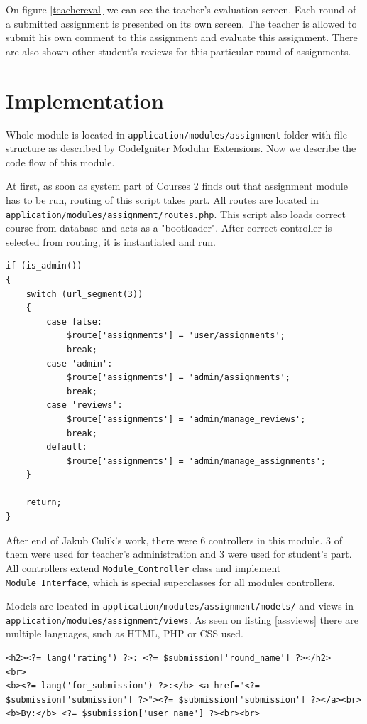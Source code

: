On figure \ref{teachereval} we can see the teacher's evaluation screen. Each round of a submitted assignment is presented on its own screen. The teacher is allowed to submit his own comment to this assignment and evaluate this assignment. There are also shown other student's reviews for this particular round of assignments. 

\section{Implementation}

Whole module is located in \texttt{application/modules/assignment} folder with file structure as described by CodeIgniter Modular Extensions. Now we describe the code flow of this module.


At first, as soon as system part of Courses 2 finds out that assignment module has to be run, routing of this script takes part. All routes are located in \texttt{application/modules/assignment/routes.php}. This script also loads correct course from database and acts as a "bootloader". After correct controller is selected from routing, it is instantiated and run.

\begin{lstlisting}[label={assrouting}, caption={Routing in assignments module for administrator}]
if (is_admin())
{
    switch (url_segment(3))
    {
        case false:
            $route['assignments'] = 'user/assignments';
            break;
        case 'admin':
            $route['assignments'] = 'admin/assignments';
            break;
        case 'reviews':
            $route['assignments'] = 'admin/manage_reviews';
            break;
        default:
            $route['assignments'] = 'admin/manage_assignments';
    }

    return;
}
\end{lstlisting}


After end of Jakub Culik's \cite{culik} work, there were 6 controllers in this module. 3 of them were used for teacher's administration and 3 were used for student's part. All controllers extend \texttt{Module\_Controller} class and implement \texttt{Module\_Interface}, which is special superclasses for all modules controllers.

Models are located in \texttt{application/modules/assignment/models/} and views in \texttt{application/modules/assignment/views}. As seen on listing \ref{assviews} there are multiple languages, such as HTML, PHP or CSS used.

\begin{lstlisting}[label={assviews}, caption={Example of view in assignments module}]
<h2><?= lang('rating') ?>: <?= $submission['round_name'] ?></h2>
<br>
<b><?= lang('for_submission') ?>:</b> <a href="<?= $submission['submission'] ?>"><?= $submission['submission'] ?></a><br>
<b>By:</b> <?= $submission['user_name'] ?><br><br>
\end{lstlisting}
